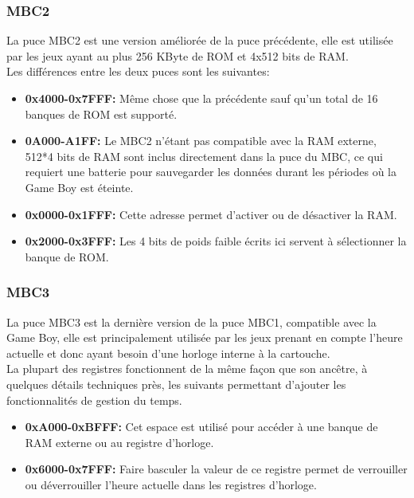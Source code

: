 \documentclass[french]{report}
\begin{document}
\subsubsection{MBC2}
	La puce MBC2 est une version améliorée de la puce précédente, elle est utilisée par les jeux ayant au plus 256 KByte de ROM et 4x512 bits de RAM.
\\Les différences entre les deux puces sont les suivantes:\\
\begin{itemize}
\item \textbf{0x4000-0x7FFF:} Même chose que la précédente sauf qu'un total de 16 banques de ROM est supporté.\\
\item \textbf{0A000-A1FF:} Le MBC2 n'étant pas compatible avec la RAM externe, 512*4 bits de RAM sont inclus directement dans la puce du MBC, ce qui requiert une batterie pour sauvegarder les données durant les périodes où la Game Boy est éteinte.\\
\item \textbf{0x0000-0x1FFF:} Cette adresse permet d'activer ou de désactiver la RAM.\\
\item \textbf{0x2000-0x3FFF:} Les 4 bits de poids faible écrits ici servent à sélectionner la banque de ROM.\\
\end{itemize}
\subsubsection{MBC3}
	La puce MBC3 est la dernière version de la puce MBC1, compatible avec la Game Boy, elle est principalement utilisée par les jeux prenant en compte l'heure actuelle et donc ayant besoin d'une horloge interne à la cartouche.\\
La plupart des registres fonctionnent de la même façon que son ancêtre, à quelques détails techniques près, les suivants permettant d'ajouter les fonctionnalités de gestion du temps.
\begin{itemize}
\item \textbf{0xA000-0xBFFF:} Cet espace est utilisé pour accéder à une banque de RAM externe ou au registre d'horloge.\\
\item \textbf{0x6000-0x7FFF:} Faire basculer la valeur de ce registre permet de verrouiller ou déverrouiller l'heure actuelle dans les registres d'horloge.\\ 
\end{itemize}
\end{document}
